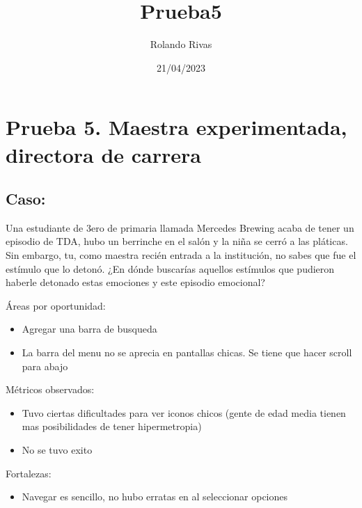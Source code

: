 \documentclass[11pt, letterpaper]{article}
\title{Prueba5}
\author{Rolando Rivas}
\date{21/04/2023}
\begin{document}
\maketitle

\section{Prueba 5. Maestra experimentada, directora de carrera}
\subsection{Caso:}
 
{\large Una estudiante de 3ero de primaria llamada Mercedes Brewing acaba de tener un episodio de TDA, hubo un berrinche en el salón y la niña se cerró a las pláticas. Sin embargo, tu, como maestra recién entrada a la institución, no sabes que fue el estímulo que lo detonó. ¿En dónde buscarías aquellos estímulos que pudieron haberle detonado estas emociones y este episodio emocional?}

Áreas por oportunidad: 
\begin{itemize}
    \item Agregar una barra de busqueda 
    \item La barra del menu no se aprecia en pantallas chicas. Se tiene que hacer scroll para abajo
\end{itemize}
Métricos observados:
\begin{itemize}
    \item Tuvo ciertas dificultades para ver iconos chicos (gente de edad media tienen mas posibilidades de tener hipermetropia) 
    \item No se tuvo exito 
\end{itemize}
Fortalezas:
\begin{itemize}
    \item Navegar es sencillo, no hubo erratas en al seleccionar opciones
\end{itemize}
\end{document}

